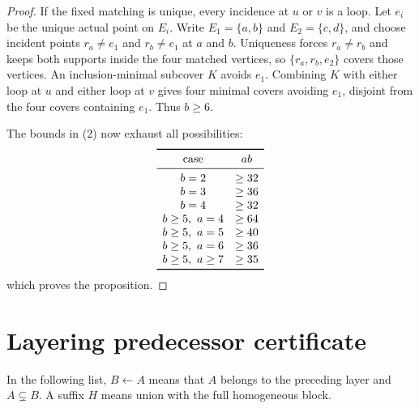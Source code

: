 \documentclass[11pt]{article}
\theoremstyle{definition}
\theoremstyle{remark}
\begin{document}
\begin{proof}
If the fixed matching is unique, every incidence at $u$ or $v$ is a loop.
Let $e_i$ be the unique actual point on $E_i$.  Write $E_1=\{a,b\}$ and
$E_2=\{c,d\}$, and choose incident points
$r_a\neq e_1$ and $r_b\neq e_1$ at $a$ and $b$.  Uniqueness forces
$r_a\neq r_b$ and keeps both supports inside the four matched vertices, so
$\{r_a,r_b,e_2\}$ covers those vertices.  An inclusion-minimal subcover
$K$ avoids $e_1$.  Combining $K$ with either loop at $u$ and either loop at
$v$ gives four minimal covers avoiding $e_1$, disjoint from the four covers
containing $e_1$.  Thus $b\geq6$.

The bounds in (2) now exhaust all possibilities:
\[
\begin{array}{cc}
\toprule
\text{case}&ab\\
\midrule
b=2&\geq32\\
b=3&\geq36\\
b=4&\geq32\\
b\geq5,\ a=4&\geq64\\
b\geq5,\ a=5&\geq40\\
b\geq5,\ a=6&\geq36\\
b\geq5,\ a\geq7&\geq35\\
\bottomrule
\end{array}
\]
which proves the proposition.
\end{proof}

\section{Layering predecessor certificate}
\label{app:layering}

In the following list, $B\leftarrow A$ means that $A$ belongs to the preceding
layer and $A\subsetneq B$.  A suffix $H$ means union with the full homogeneous
block.
\end{document}
